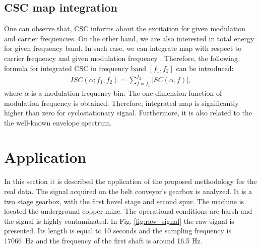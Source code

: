 \documentclass[11pt]{article}
\begin{document}
\subsection{CSC map integration}
One can observe that, CSC informs about the excitation for given modulation and carrier frequencies. On the other hand, we are also interested in total energy for  given frequency band. In such case,  we can integrate map with respect to carrier frequency and given modulation frequency \cite{randall2001relationship}. Therefore, the following formula for integrated  CSC in frequency band $[f_1,f_2]$ can be introduced:
\begin{align}
 ISC(\alpha;f_1,f_2)=\sum_{f=f_1}^{f_2}\left|SC(\alpha,f)\right|,
\end{align}
where $\alpha$ is a modulation frequency bin. The one dimension function of modulation frequency is obtained. Therefore, integrated map is significantly higher than zero for cyclostationary signal. Furthermore, it is also related to the the well-known envelope spectrum.

\section{Application}
\label{sec:application}
In this section it is described the application of the proposed methodology for the real data. The signal acquired on the belt conveyor's gearbox is analyzed. It is a two stage gearbox, with the first bevel stage and second spur. The machine is located the underground copper mine. The operational conditions are harsh and the signal is highly contaminated. In Fig. \ref{fig:raw_signal} the raw signal is presented. Its length is equal to 10 seconds and the sampling frequency is 17066~Hz and the frequency of the first shaft is around 16.5 Hz.
\end{document}
